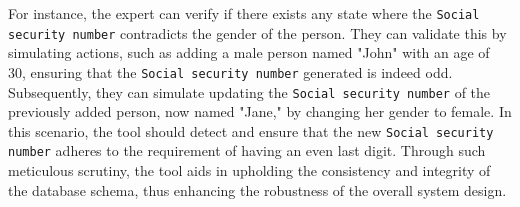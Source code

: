 For instance, the expert can verify if there exists any state where the \texttt{Social security number} contradicts the gender of the person.
They can validate this by simulating actions, such as adding a male person named "John" with an age of 30, ensuring that the \texttt{Social security number} generated is indeed odd.
Subsequently, they can simulate updating the \texttt{Social security number} of the previously added person, now named "Jane," by changing her gender to female.
In this scenario, the tool should detect and ensure that the new \texttt{Social security number} adheres to the requirement of having an even last digit.
Through such meticulous scrutiny, the tool aids in upholding the consistency and integrity of the database schema, thus enhancing the robustness of the overall system design.


%
%
%

